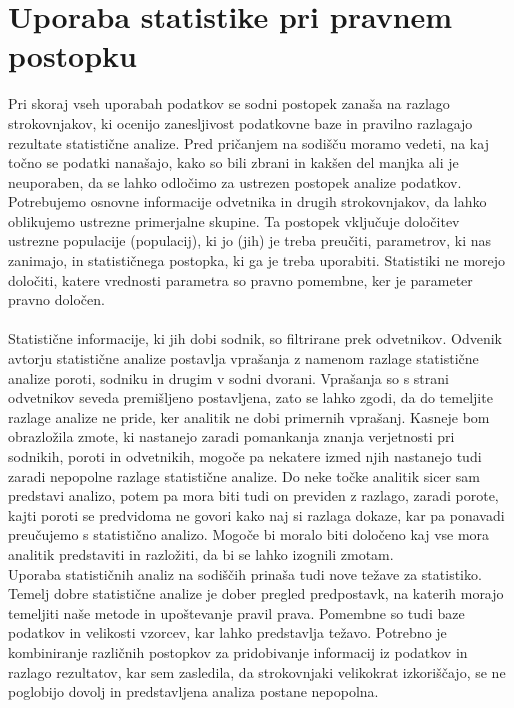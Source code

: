 \documentclass[12pt,a4paper]{amsart}
\theoremstyle{definition} %
\theoremstyle{plain} %
\begin{document}
\section{Uporaba statistike pri pravnem postopku}
Pri skoraj vseh uporabah podatkov se sodni postopek zanaša na razlago strokovnjakov, ki ocenijo zanesljivost podatkovne baze in pravilno razlagajo 
rezultate statistične analize. Pred pričanjem na sodišču moramo vedeti, 
na kaj točno se podatki nanašajo, kako so bili zbrani in kakšen del manjka ali je neuporaben, da se lahko odločimo za ustrezen postopek analize podatkov.
Potrebujemo osnovne informacije odvetnika in drugih strokovnjakov, da lahko oblikujemo ustrezne primerjalne skupine. Ta postopek vključuje 
določitev ustrezne populacije (populacij), ki jo (jih) je treba preučiti, parametrov, ki nas zanimajo, in statističnega postopka, ki ga je treba uporabiti. 
Statistiki ne morejo določiti, katere vrednosti parametra so pravno pomembne, ker je parameter pravno določen.\\\\
Statistične informacije, ki jih dobi sodnik, so filtrirane prek odvetnikov. Odvenik avtorju statistične analize postavlja vprašanja z namenom razlage 
statistične analize poroti, sodniku in drugim v sodni dvorani. Vprašanja so s strani odvetnikov seveda premišljeno postavljena, zato se lahko zgodi, da do 
temeljite razlage analize ne pride, ker analitik ne dobi primernih vprašanj. Kasneje bom obrazložila zmote, ki nastanejo zaradi pomankanja znanja verjetnosti 
pri sodnikih, poroti in odvetnikih, mogoče pa nekatere izmed njih nastanejo tudi zaradi nepopolne razlage statistične analize. Do neke točke analitik sicer sam 
predstavi analizo, potem pa mora biti tudi on previden z razlago, zaradi porote, kajti poroti se predvidoma ne govori kako naj si razlaga dokaze, kar pa ponavadi preučujemo 
s statistično analizo. Mogoče bi moralo biti določeno kaj vse mora analitik predstaviti in razložiti, da bi se lahko izognili zmotam.\\
Uporaba statističnih analiz na sodiščih prinaša tudi nove težave za statistiko. Temelj dobre statistične analize je dober pregled predpostavk, na 
katerih morajo temeljiti naše metode in upoštevanje pravil prava. Pomembne so tudi baze podatkov in velikosti vzorcev, kar lahko predstavlja težavo. 
Potrebno je kombiniranje različnih postopkov za pridobivanje informacij iz podatkov in razlago rezultatov, kar sem zasledila, da strokovnjaki velikokrat 
izkoriščajo, se ne poglobijo dovolj in predstavljena analiza postane nepopolna.
\end{document}
